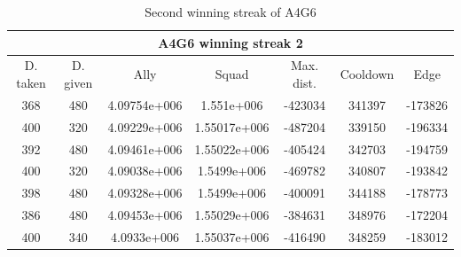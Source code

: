 \begin{centering}
\begin{table}[H]
 \begin{tabular}{|c||c|c|c|c|c|c|}
	\multicolumn{7}{c}{A4G6 winning streak 2} \\
	\hline
	D. taken & 				D. given & 			Ally & 			Squad & 			Max. dist. & 			Cooldown & 				Edge \\
	\hline
	368& 								480& 					4.09754e+006&	1.551e+006&		-423034&							341397&				-173826\\
	400& 								320& 					4.09229e+006&	1.55017e+006&	-487204&							339150&				-196334\\
	392& 								480& 					4.09461e+006&	1.55022e+006&	-405424&							342703&				-194759\\
	400& 								320& 					4.09038e+006&	1.5499e+006&		-469782&							340807&				-193842\\
	398& 								480& 					4.09328e+006&	1.5499e+006&		-400091&							344188&				-178773\\
	386& 								480& 					4.09453e+006&	1.55029e+006&	-384631&							348976&				-172204\\
	400&		 							340&						4.0933e+006&		1.55037e+006&	-416490&							348259&				-183012\\

	\hline

\end{tabular}
	\caption{Second winning streak of A4G6}
	\label{winning_streak_A4G6_1_2}
\end{table}
\end{centering}



